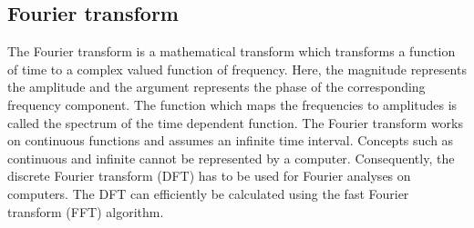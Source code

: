\documentclass[a4paper,10pt,twocolumn]{article}
\begin{document}
\subsection{Fourier transform}  \label{sec:fourier}
The Fourier transform is a mathematical transform which transforms a function of time to a complex valued function of frequency. Here, the magnitude represents the amplitude and the argument represents the phase of the corresponding frequency component. The function which maps the frequencies to amplitudes is called the spectrum of the time dependent function. The Fourier transform works on continuous functions and assumes an infinite time interval. Concepts such as continuous and infinite cannot be represented by a computer. Consequently, the discrete Fourier transform (DFT) has to be used for Fourier analyses on computers. The DFT can efficiently be calculated using the fast Fourier transform (FFT) algorithm.
\end{document}
